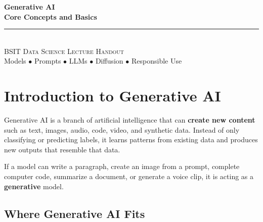 \documentclass[11pt,a4paper]{article}
\begin{document}
\begin{center}
\vspace*{0.5cm}
{\Huge\bfseries\textcolor{primary}{Generative AI}}\\[8pt]
{\Huge\bfseries\textcolor{primary}{Core Concepts and Basics}}\\[16pt]
{\color{secondary}\rule{0.6\textwidth}{1.5pt}}\\[14pt]
{\Large\textsc{BSIT Data Science Lecture Handout}}\\[8pt]
{\large\textcolor{gray!70!black}{Models $\bullet$ Prompts $\bullet$ LLMs $\bullet$ Diffusion $\bullet$ Responsible Use}}
\vspace{0.3cm}
\end{center}

\tableofcontents
\newpage

\section{Introduction to Generative AI}

\begin{definitionbox}[Generative AI]
Generative AI is a branch of artificial intelligence that can \textbf{create new content} such as text, images, audio, code, video, and synthetic data. Instead of only classifying or predicting labels, it learns patterns from existing data and produces new outputs that resemble that data.
\end{definitionbox}

\begin{conceptbox}
If a model can write a paragraph, create an image from a prompt, complete computer code, summarize a document, or generate a voice clip, it is acting as a \textbf{generative} model.
\end{conceptbox}

\subsection{Where Generative AI Fits}
\end{document}
